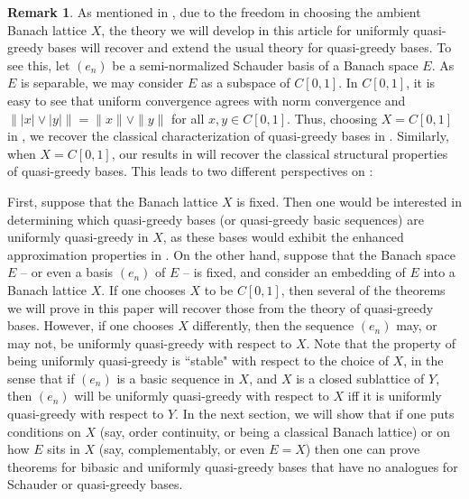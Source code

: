 \documentclass[12pt,leqno]{amsart}
\numberwithin{equation}{section}
\theoremstyle{definition}
\newtheorem{remark}[theorem]{Remark}
\begin{document}
\begin{remark}\label{recover usual}
As mentioned in , due to the freedom in choosing the ambient Banach lattice $X$, the theory we will develop in this article for uniformly quasi-greedy bases  will recover and extend the usual theory for quasi-greedy bases. To see this, let $(e_n)$ be a semi-normalized Schauder basis of a Banach space $E$. As $E$ is separable, we may consider $E$ as a subspace of $C[0,1]$. In $C[0,1]$, it is easy to see that uniform convergence agrees with norm convergence and $\| |x|\vee |y|\|=\|x\|\vee\|y\|$ for all $x,y\in C[0,1]$. Thus, choosing $X=C[0,1]$ in , we recover the classical characterization of quasi-greedy bases in . Similarly, when $X=C[0,1]$,  our results in  will recover the classical structural properties of quasi-greedy bases. This leads to two different perspectives on :
\medskip

First, suppose that the Banach lattice $X$ is fixed. Then one would be interested in determining which  quasi-greedy bases (or quasi-greedy basic sequences) are uniformly quasi-greedy in $X$, as these bases would exhibit  the enhanced approximation properties in .
On the other hand, suppose  that the Banach space $E$ -- or even a  basis $(e_n)$ of $E$  --  is fixed, and consider an embedding of $E$  into a Banach lattice $X$. If one chooses $X$ to be $C[0,1]$, then several of the theorems we will prove in this paper will recover those from the theory of quasi-greedy bases. However, if one chooses $X$ differently, then the sequence $(e_n)$ may, or may not, be uniformly quasi-greedy with respect to $X$. Note that the property of being uniformly quasi-greedy is ``stable" with respect to the choice of $X$, in the sense that if $(e_n)$ is a basic sequence in $X$, and $X$ is a closed sublattice of $Y$, then $(e_n)$ will be uniformly quasi-greedy with respect to $X$ iff it is uniformly quasi-greedy with respect to $Y$. In the next section, we will show that if one puts conditions on $X$ (say, order continuity, or being a classical Banach lattice) or on how $E$ sits in $X$ (say, complementably, or even $E=X$) then one can prove theorems for bibasic and uniformly quasi-greedy bases that have no analogues for Schauder or quasi-greedy bases. %
\end{remark}
\end{document}
